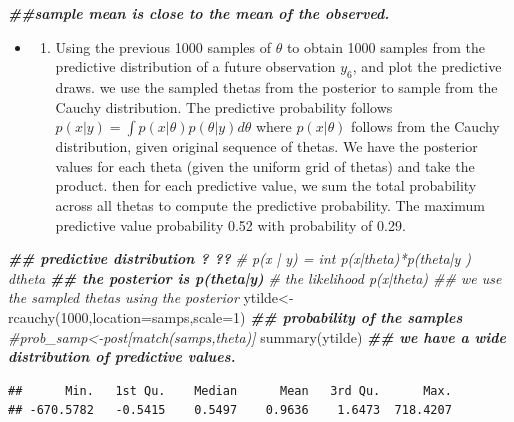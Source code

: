 \documentclass[
]{book}
\newenvironment{Shaded}{\begin{snugshade}}{\end{snugshade}}
\newcommand{\AttributeTok}[1]{\textcolor[rgb]{0.77,0.63,0.00}{#1}}
\newcommand{\CommentTok}[1]{\textcolor[rgb]{0.56,0.35,0.01}{\textit{#1}}}
\newcommand{\DecValTok}[1]{\textcolor[rgb]{0.00,0.00,0.81}{#1}}
\newcommand{\DocumentationTok}[1]{\textcolor[rgb]{0.56,0.35,0.01}{\textbf{\textit{#1}}}}
\newcommand{\FunctionTok}[1]{\textcolor[rgb]{0.00,0.00,0.00}{#1}}
\newcommand{\NormalTok}[1]{#1}
\newcommand{\OtherTok}[1]{\textcolor[rgb]{0.56,0.35,0.01}{#1}}
\providecommand{\tightlist}{%
  \setlength{\itemsep}{0pt}\setlength{\parskip}{0pt}}
\theoremstyle{definition}
\theoremstyle{definition}
\theoremstyle{definition}
\theoremstyle{definition}
\theoremstyle{remark}
\begin{document}
\begin{Shaded}
\begin{Highlighting}[]
  \DocumentationTok{\#\#sample mean is close to the mean of the observed.}
\end{Highlighting}
\end{Shaded}

\begin{itemize}
\item
  \begin{enumerate}
  \def\labelenumi{(\alph{enumi})}
  \setcounter{enumi}{2}
  \tightlist
  \item
    Using the previous 1000 samples of \(\theta\) to obtain 1000 samples from the predictive distribution of a future observation \(y_6\), and plot the predictive draws.
    we use the sampled thetas from the posterior to sample from the Cauchy distribution. The predictive probability follows \(p(x|y) =\int p(x|\theta)p(\theta|y)d\theta\) where \(p(x|\theta)\) follows from the Cauchy distribution, given original sequence of thetas. We have the posterior values for each theta (given the uniform grid of thetas) and take the product. then for each predictive value, we sum the total probability across all thetas to compute the predictive probability. The maximum predictive value probability 0.52 with probability of 0.29.
  \end{enumerate}
\end{itemize}

\begin{Shaded}
\begin{Highlighting}[]
\DocumentationTok{\#\# predictive distribution ? ?? }
 \CommentTok{\# p(x | y) = int p(x|theta)*p(theta|y ) dtheta}
\DocumentationTok{\#\# the posterior is p(theta|y) }
 \CommentTok{\# the likelihood p(x|theta)  \#\# we use the sampled thetas using the posterior}
\NormalTok{ ytilde}\OtherTok{\textless{}{-}}\FunctionTok{rcauchy}\NormalTok{(}\DecValTok{1000}\NormalTok{,}\AttributeTok{location=}\NormalTok{samps,}\AttributeTok{scale=}\DecValTok{1}\NormalTok{) }
 \DocumentationTok{\#\# probability of the samples }
 \CommentTok{\#prob\_samp\textless{}{-}post[match(samps,theta)]}
  \FunctionTok{summary}\NormalTok{(ytilde) }\DocumentationTok{\#\# we have a wide distribution of predictive values.}
\end{Highlighting}
\end{Shaded}

\begin{verbatim}
##      Min.   1st Qu.    Median      Mean   3rd Qu.      Max. 
## -670.5782   -0.5415    0.5497    0.9636    1.6473  718.4207
\end{verbatim}
\end{document}
